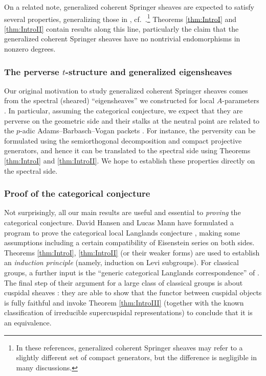 \documentclass{amsart}
\theoremstyle{definition}
\theoremstyle{remark}
\numberwithin{equation}{section}
\begin{document}
On a related note, generalized coherent Springer sheaves are expected to satisfy several properties, generalizing those in \cite{BCHNspringer, Propp, ZhuTame}, cf.~\cite{Beijingnotes}.\footnote{In these references, generalized coherent Springer sheaves may refer to a slightly different set of compact generators, but the difference is negligible in many discussions.} Theorems \ref{thm:IntroI} and \ref{thm:IntroII} contain results along this line, particularly the claim that the generalized coherent Springer sheaves have no nontrivial endomorphisms in nonzero degrees. 

\subsubsection{The perverse $t$-structure and generalized eigensheaves}
Our original motivation to study generalized coherent Springer sheaves comes from the spectral (sheared) ``eigensheaves'' we constructed for local $A$-parameters \cite{koshikawaoberwolfach2024}. In particular, assuming the categorical conjecture, we expect that they are perverse on the geometric side and their stalks at the neutral point are related to the $p$-adic Adams--Barbasch--Vogan packets \cite{CFMMX}. For instance, the perversity can be formulated using the semiorthogonal decomposition and compact projective generators, and hence it can be translated to the spectral side using Theorems \ref{thm:IntroI} and \ref{thm:IntroII}. We hope to establish these properties directly on the spectral side. 

\subsubsection{Proof of the categorical conjecture}
Not surprisingly, all our main results are useful and essential to \emph{proving} the categorical conjecture. David Hansen and Lucas Mann have formulated a program to prove the categorical local Langlands conjecture \cite{HansenMann}, making some assumptions including a certain compatibility of Eisenstein series on both sides. Theorems \ref{thm:IntroI}, \ref{thm:IntroII} (or their weaker forms) are used to establish an \emph{induction principle} \cite[Theorem 6.8.1]{HansenMann} (namely, induction on Levi subgroups). For classical groups, a further input is the ``generic categorical Langlands correspondence'' of \cite{HelmSolleveldXu}. The final step of their argument for a large class of classical groups is about cuspidal sheaves \cite[\S 8.3]{HansenMann}: they are able to show that the functor between cuspidal objects is fully faithful and invoke Theorem \ref{thm:IntroIII} (together with the known classification of irreducible supercuspidal representations) to conclude that it is an equivalence. 
\end{document}
